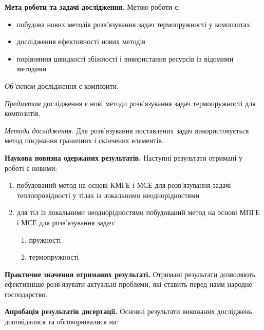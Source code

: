 \textbf{Мета роботи та задачі дослідження.} Метою роботи є:

\begin{itemize}
\item
  побудова нових методів розв'язування задач термопружності у композитах
\item
  дослідження ефективності нових методів
\item
  порівняння швидкості збіжності і використання ресурсів із відомими
  методами
\end{itemize}

\emph{Об'єктом} дослідження є композити.

\emph{Предметом} дослідження є нові методи розв'язування задач
термопружності для композитів.

\emph{Методи дослідження.} Для розв'язування поставлених задач
використовується метод поєднання граничних і скінчених елементів.

\textbf{Наукова новизна одержаних результатів.} Наступні
результати отримані у роботі є новими:

\begin{enumerate}
\def\labelenumi{\arabic{enumi}.}
\item
  побудований метод на основі КМГЕ і МСЕ для розв'язування задачі
  теплопровідності у тілах із локальними неоднорідностями
\item
  для тіл із локальними неоднорідностями побудований метод на основі
  МПГЕ і МСЕ для розв'язування задач:

  \begin{enumerate}
  \def\labelenumii{\alph{enumii}.}
  \item
    пружності
  \item
    термопружності
  \end{enumerate}
\end{enumerate}

\textbf{Практичне значення отриманих результаті.} Отримані
результати дозволяють ефективніше розв'язувати актуальні проблеми, які
ставить перед нами народне господарство.

\textbf{Апробація результатів дисертації.} Основні результати
виконаних досліджень доповідалися та обговорювалися на:

